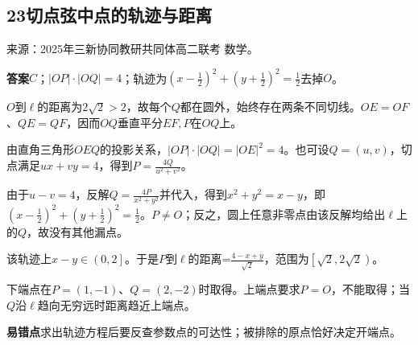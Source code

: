 \documentclass[UTF8,11pt,a4paper,fontset=windows]{ctexart}
\newcommand{\qhead}[2]{\subsection{#1\texorpdfstring{\quad}{ }#2}}
\newcommand{\qsource}[1]{{\footnotesize 来源：#1。\par}}
\begin{document}
\qhead{23}{切点弦中点的轨迹与距离}
\qsource{2025年三新协同教研共同体高二联考 数学}
\textbf{答案}\quad \(C\)；\(\lvert OP\rvert \cdot \lvert OQ\rvert = 4\)；轨迹为\(\left(x- \frac{1}{2}\right)^{2}+ \left(y+ \frac{1}{2}\right)^{2}= \frac{1}{2}\)去掉\(O\)。\par
\(O\)到\(\ell \)的距离为\(2\sqrt{2}> 2\)，故每个\(Q\)都在圆外，始终存在两条不同切线。\(OE= OF\)、\(QE= QF\)，因而\(OQ\)垂直平分\(EF,\allowbreak P\)在\(OQ\)上。\par
由直角三角形\(OEQ\)的投影关系，\(\lvert OP\rvert \cdot \lvert OQ\rvert = \lvert OE\rvert ^{2}= 4\)。也可设\(Q= \left(u,\allowbreak v\right)\)，切点满足\(ux+ vy= 4\)，得到\(P= \frac{4Q}{u^{2}+ v^{2}}\)。\par
由于\(u- v= 4\)，反解\(Q= \frac{4P}{x^{2}+ y^{2}}\)并代入，得到\(x^{2}+ y^{2}= x- y\)，即\(\left(x- \frac{1}{2}\right)^{2}+ \left(y+ \frac{1}{2}\right)^{2}= \frac{1}{2}\)。\(P\ne O\)；反之，圆上任意非零点由该反解均给出\(\ell \)上的\(Q\)，故没有其他漏点。\par
该轨迹上\(x- y\in \left(0,\allowbreak 2\right]\)。于是\(P\)到\(\ell \)的距离=\(\frac{4- x+ y}{\sqrt{2}}\)，范围为\(\left[\sqrt{2},\allowbreak 2\sqrt{2}\right)\)。\par
下端点在\(P= \left(1,\allowbreak - 1\right)\)、\(Q= \left(2,\allowbreak - 2\right)\)时取得。上端点要求\(P= O\)，不能取得；当\(Q\)沿\(\ell \)趋向无穷远时距离趋近上端点。\par
{\small\textbf{易错点}\quad 求出轨迹方程后要反查参数点的可达性；被排除的原点恰好决定开端点。\par}
\end{document}
